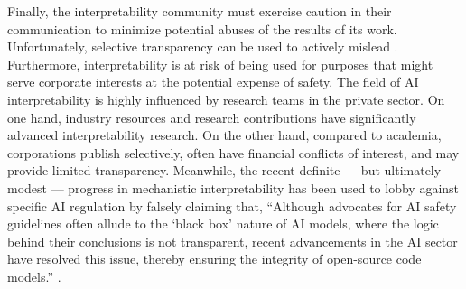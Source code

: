 Finally, the interpretability community must exercise caution in their communication to minimize potential abuses of the results of its work. Unfortunately, selective transparency can be used to actively mislead \citep{Ananny_2018_LimitationsTransparency}. Furthermore, interpretability is at risk of being used for purposes that might serve corporate interests at the potential expense of safety. The field of AI interpretability is highly influenced by research teams in the private sector. On one hand, industry resources and research contributions have significantly advanced interpretability research. On the other hand, compared to academia, corporations publish selectively, often have financial conflicts of interest, and may provide limited transparency. Meanwhile, the recent definite — but ultimately modest — progress in mechanistic interpretability has been used to lobby against specific AI regulation by falsely claiming that, “Although advocates for AI safety guidelines often allude to the `black box' nature of AI models, where the logic behind their conclusions is not transparent, recent advancements in the AI sector have resolved this issue, thereby ensuring the integrity of open-source code models.” \citep{a16z_2023_lobbying}.


